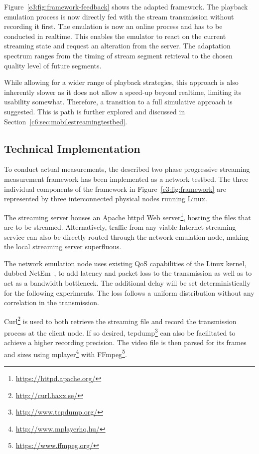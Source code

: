 Figure~\ref{c3:fig:framework-feedback} shows the adapted framework. The playback emulation process is now directly fed with the stream transmission without recording it first. The emulation is now an online process and has to be conducted in realtime. This enables the emulator to react on the current streaming state and request an alteration from the server. The adaptation spectrum ranges from the timing of stream segment retrieval to the chosen quality level of future segments. 

While allowing for a wider range of playback strategies, this approach is also inherently slower as it does not allow a speed-up beyond realtime, limiting its usability somewhat. Therefore, a transition to a full simulative approach is suggested. This is path is further explored and discussed in Section~\ref{c6:sec:mobilestreamingtestbed}.


\subsection{Technical Implementation}

To conduct actual measurements, the described two phase progressive streaming measurement framework has been implemented as a network testbed. The three individual components of the framework in Figure~\ref{c3:fig:framework} are represented by three interconnected physical nodes running Linux. 

The streaming server houses an Apache httpd Web server\footnote{\url{https://httpd.apache.org/}}, hosting the files that are to be streamed. Alternatively, traffic from any viable Internet streaming service can also be directly routed through the network emulation node, making the local streaming server superfluous.

The network emulation node uses existing \gls{QoS} capabilities of the Linux kernel, dubbed NetEm~\cite{hemminger2005network}, to add latency and packet loss to the transmission as well as to act as a bandwidth bottleneck. The additional delay will be set deterministically for the following experiments. The loss follows a uniform distribution without any correlation in the transmission.

Curl\footnote{\url{http://curl.haxx.se/}} is used to both retrieve the streaming file and record the transmission process at the client node. If so desired, tcpdump\footnote{\url{http://www.tcpdump.org/}} can also be facilitated to achieve a higher recording precision. The video file is then parsed for its frames and sizes using mplayer\footnote{\url{http://www.mplayerhq.hu/}} with FFmpeg\footnote{\url{https://www.ffmpeg.org/}}. 

